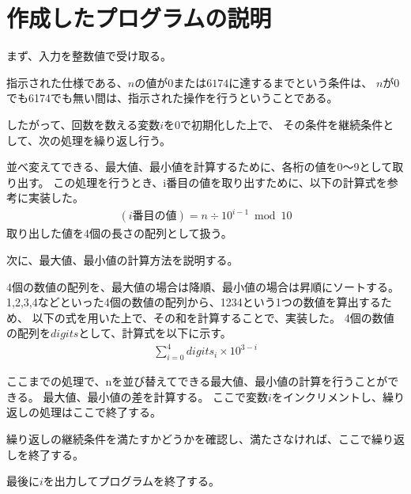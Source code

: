

\section{作成したプログラムの説明}
まず、入力を整数値で受け取る。

指示された仕様である、$n$の値が$0$または$6174$に達するまでという条件は、
$n$が0でも6174でも無い間は、指示された操作を行うということである。

したがって、回数を数える変数$i$を0で初期化した上で、
その条件を継続条件として、次の処理を繰り返し行う。

並べ変えてできる、最大値、最小値を計算するために、各桁の値を0〜9として取り出す。
この処理を行うとき、i番目の値を取り出すために、以下の計算式を参考に実装した。
\begin{align*}
    (i番目の値) = n \div 10^{i-1} \bmod 10
\end{align*}
取り出した値を4個の長さの配列として扱う。


次に、最大値、最小値の計算方法を説明する。

4個の数値の配列を、最大値の場合は降順、最小値の場合は昇順にソートする。
1,2,3,4などといった4個の数値の配列から、1234という1つの数値を算出するため、
以下の式を用いた上で、その和を計算することで、実装した。
4個の数値の配列を$digits$として、計算式を以下に示す。
\begin{align*}
    \sum_{i=0}^4 digits_i \times 10^{3-i}
\end{align*}

ここまでの処理で、nを並び替えてできる最大値、最小値の計算を行うことができる。
最大値、最小値の差を計算する。
ここで変数$i$をインクリメントし、繰り返しの処理はここで終了する。

繰り返しの継続条件を満たすかどうかを確認し、満たさなければ、ここで繰り返しを終了する。

最後に$i$を出力してプログラムを終了する。


